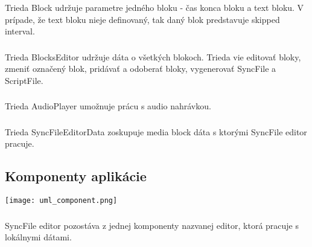 \documentclass{article}
\begin{document}
\subsubsection{}
Trieda Block udržuje parametre jedného bloku - čas konca bloku a text bloku.
V prípade, že text bloku nieje definovaný, tak daný blok predstavuje skipped interval.

\subsubsection{}
Trieda BlocksEditor udržuje dáta o všetkých blokoch. Trieda vie editovať bloky, zmeniť označený blok, pridávať a odoberať bloky, vygenerovať SyncFile a ScriptFile.

\subsubsection{}
Trieda AudioPlayer umožnuje prácu s audio nahrávkou.

\subsubsection{}
Trieda SyncFileEditorData zoskupuje media block dáta s ktorými SyncFile editor pracuje.

\subsection{Komponenty aplikácie}

\texttt{[image: uml\_component.png]}

\subsubsection{}
SyncFile editor pozostáva z jednej komponenty nazvanej editor, ktorá pracuje s lokálnymi dátami.
\end{document}

